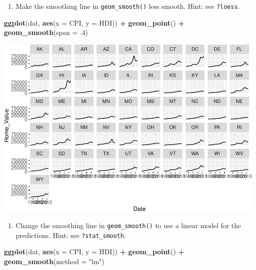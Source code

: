 \documentclass[]{book}
\newenvironment{Shaded}{\begin{snugshade}}{\end{snugshade}}
\newcommand{\DataTypeTok}[1]{\textcolor[rgb]{0.13,0.29,0.53}{#1}}
\newcommand{\FloatTok}[1]{\textcolor[rgb]{0.00,0.00,0.81}{#1}}
\newcommand{\KeywordTok}[1]{\textcolor[rgb]{0.13,0.29,0.53}{\textbf{#1}}}
\newcommand{\NormalTok}[1]{#1}
\newcommand{\OperatorTok}[1]{\textcolor[rgb]{0.81,0.36,0.00}{\textbf{#1}}}
\newcommand{\StringTok}[1]{\textcolor[rgb]{0.31,0.60,0.02}{#1}}
\providecommand{\tightlist}{%
  \setlength{\itemsep}{0pt}\setlength{\parskip}{0pt}}
\begin{document}
\begin{enumerate}
\def\labelenumi{\arabic{enumi}.}
\setcounter{enumi}{2}
\tightlist
\item
  Make the smoothing line in \texttt{geom\_smooth()} less smooth. Hint: see \texttt{?loess}.
\end{enumerate}

\begin{Shaded}
\begin{Highlighting}[]
\KeywordTok{ggplot}\NormalTok{(dat, }\KeywordTok{aes}\NormalTok{(}\DataTypeTok{x =}\NormalTok{ CPI, }\DataTypeTok{y =}\NormalTok{ HDI)) }\OperatorTok{+}
\StringTok{  }\KeywordTok{geom_point}\NormalTok{() }\OperatorTok{+}
\StringTok{  }\KeywordTok{geom_smooth}\NormalTok{(}\DataTypeTok{span =} \FloatTok{.4}\NormalTok{)}
\end{Highlighting}
\end{Shaded}

\includegraphics{R/Rgraphics/figures/unnamed-chunk-178-1.pdf}

\begin{enumerate}
\def\labelenumi{\arabic{enumi}.}
\setcounter{enumi}{3}
\tightlist
\item
  Change the smoothing line in \texttt{geom\_smooth()} to use a linear model for the predictions. Hint: see \texttt{?stat\_smooth}.
\end{enumerate}

\begin{Shaded}
\begin{Highlighting}[]
\KeywordTok{ggplot}\NormalTok{(dat, }\KeywordTok{aes}\NormalTok{(}\DataTypeTok{x =}\NormalTok{ CPI, }\DataTypeTok{y =}\NormalTok{ HDI)) }\OperatorTok{+}
\StringTok{  }\KeywordTok{geom_point}\NormalTok{() }\OperatorTok{+}
\StringTok{  }\KeywordTok{geom_smooth}\NormalTok{(}\DataTypeTok{method =} \StringTok{"lm"}\NormalTok{)}
\end{Highlighting}
\end{Shaded}
\end{document}

